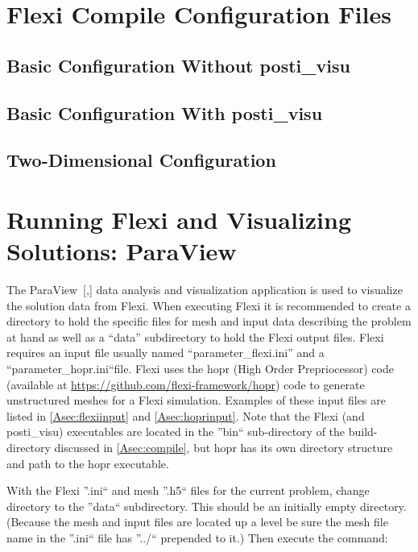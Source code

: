 \begin{appendices}
\section{Flexi Compile Configuration Files}\label{sec:configFiles}

\subsection{Basic Configuration Without posti\_visu}\label{ssec:1Dconfig}


\subsection{Basic Configuration With posti\_visu}\label{ssec:1DconfigPosti}

\subsection{Two-Dimensional Configuration}\label{ssec:2Dconfig}


\section{Running Flexi and Visualizing Solutions: ParaView}\label{sec:paraview}
\setcounter{figure}{0}

The ParaView~[\cite{ParaView},\cite{ParaViewManual}] data analysis and visualization application is used to visualize the solution data from Flexi.  When executing Flexi it is recommended to create a directory to hold the specific files for mesh and input data describing the problem at hand as well as a  ``data'' subdirectory to hold the Flexi output files. Flexi requires an input file usually named ``parameter\_flexi.ini'' and a ``parameter\_hopr.ini``file.  Flexi uses the hopr (High Order Prepriocessor) code (available at \url{https://github.com/flexi-framework/hopr}) code to generate unstructured meshes for a Flexi simulation. Examples of these input files are listed in \ref{Asec:flexiinput} and \ref{Asec:hoprinput}.  Note that the Flexi (and posti\_visu) executables are located in the ''bin`` sub-directory of the build-directory discussed in \ref{Asec:compile}, but hopr has its own directory structure and path to the hopr executable.

With the Flexi ''.ini``  and mesh ''.h5`` files for the current problem, change directory to the ''data`` subdirectory.  This should be an initially empty directory.  (Because the mesh and input files are located up a level be sure the mesh file name in the ''.ini`` file has ''../`` prepended to it.)   Then execute the command:


\end{appendices}
